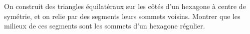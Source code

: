 On construit des triangles équilatéraux sur les côtés d'un hexagone à centre de symétrie, et on relie par des segments leurs sommets voisins. Montrer que les milieux de ces segments sont les sommets d'un hexagone régulier.
